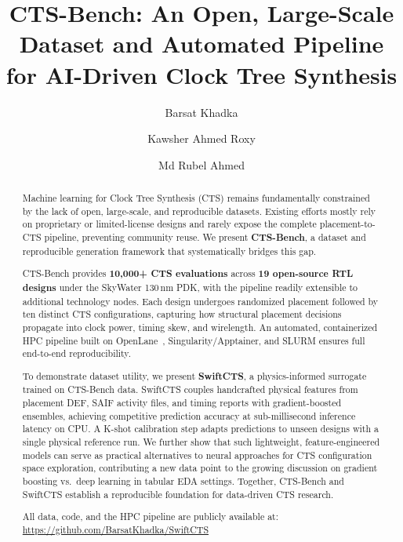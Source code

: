 \documentclass[acmsmall,review,anonymous]{acmart}
\begin{document}
\title{CTS-Bench: An Open, Large-Scale Dataset and Automated Pipeline for
       AI-Driven Clock Tree Synthesis}

\author{Barsat Khadka}

\author{Kawsher Ahmed Roxy}

\author{Md Rubel Ahmed}

\begin{abstract}
Machine learning for Clock Tree Synthesis (CTS) remains fundamentally
constrained by the lack of open, large-scale, and reproducible datasets.
Existing efforts mostly rely on proprietary or limited-license designs
and rarely expose the complete placement-to-CTS pipeline, preventing
community reuse. We present \textbf{CTS-Bench}, a dataset and reproducible
generation framework that systematically bridges this gap.

CTS-Bench provides \textbf{10,000+ CTS evaluations} across
\textbf{19 open-source RTL designs} under the SkyWater 130\,nm PDK,
with the pipeline readily extensible to additional technology nodes.
Each design undergoes randomized placement followed by ten distinct CTS
configurations, capturing how structural placement decisions propagate
into clock power, timing skew, and wirelength. An automated, containerized
HPC pipeline built on OpenLane~\cite{OpenRoad}, Singularity/Apptainer, and
SLURM ensures full end-to-end reproducibility.

To demonstrate dataset utility, we present \textbf{SwiftCTS}, a
physics-informed surrogate trained on CTS-Bench data. SwiftCTS couples
handcrafted physical features from placement DEF, SAIF activity files, and
timing reports with gradient-boosted ensembles, achieving competitive
prediction accuracy at sub-millisecond inference latency on CPU. A K-shot
calibration step adapts predictions to unseen designs with a single
physical reference run. We further show that such lightweight,
feature-engineered models can serve as practical alternatives to
neural approaches for CTS configuration space exploration, contributing
a new data point to the growing discussion on gradient boosting vs.\ deep
learning in tabular EDA settings.
Together, CTS-Bench and SwiftCTS establish a reproducible foundation for
data-driven CTS research.

All data, code, and the HPC pipeline are publicly available at:
\href{https://github.com/BarsatKhadka/SwiftCTS}{https://github.com/BarsatKhadka/SwiftCTS}
\end{abstract}
\end{document}
